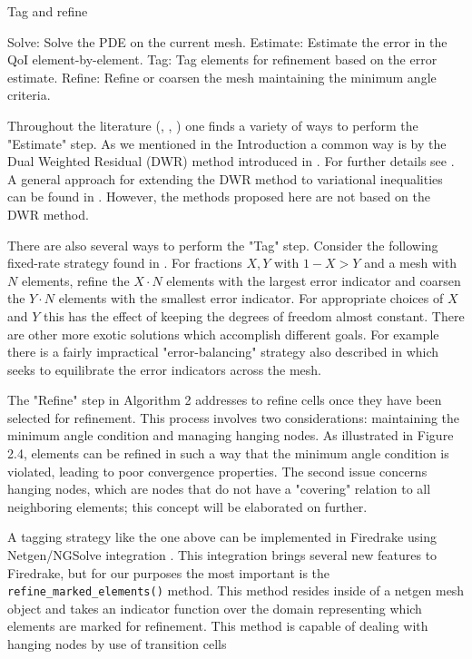 \documentclass[]{interact}
\theoremstyle{plain}%
\theoremstyle{definition}
\theoremstyle{remark}
\begin{document}
\begin{algorithm}
  \caption{Tag and refine}
  \begin{algorithmic}
    \State Solve: Solve the PDE on the current mesh. 
    \State Estimate: Estimate the error in the QoI element-by-element.
    \State Tag: Tag elements for refinement based on the error estimate.
    \State Refine: Refine or coarsen the mesh maintaining the minimum angle criteria.
  \end{algorithmic}
\end{algorithm}

Throughout the literature (\cite{BeckerRannacher2001}, \cite{BangerthRannacher2003}, \cite{Suttmeier2008}) one finds a variety of ways to perform the "Estimate" step. As we mentioned in the Introduction a common way is by the Dual Weighted Residual (DWR) method introduced in \cite{BeckerRannacher2001}. For further details see \cite[Chapter 3]{BangerthRannacher2003}. A general approach for extending the DWR method to variational inequalities can be found in \cite{Suttmeier2008}.  However, the methods proposed here are not based on the DWR method. 

There are also several ways to perform the "Tag" step. Consider the following fixed-rate strategy found in \cite[Chapter 4]{BangerthRannacher2003}. For fractions $X, Y$ with $1 - X > Y$ and a mesh with $N$ elements, refine the $X\cdot N$ elements with the largest error indicator and coarsen the $Y\cdot N$ elements with the smallest error indicator. For appropriate choices of $X$ and $Y$ this has the effect of keeping the degrees of freedom almost constant. There are other more exotic solutions which accomplish different goals. For example there is a fairly impractical "error-balancing" strategy also described in \cite[Chapter 4]{BangerthRannacher2003} which seeks to equilibrate the error indicators across the mesh.

The "Refine" step in Algorithm 2 addresses to refine cells once they have been selected for refinement. This process involves two considerations: maintaining the minimum angle condition and managing hanging nodes. As illustrated in Figure 2.4, elements can be refined in such a way that the minimum angle condition is violated, leading to poor convergence properties. The second issue concerns hanging nodes, which are nodes that do not have a "covering" relation to all neighboring elements; this concept will be elaborated on further.

A tagging strategy like the one above can be implemented in Firedrake using Netgen/NGSolve integration \cite{Betteridgeetal2024}.  This integration brings several new features to Firedrake, but for our purposes the most important is the \texttt{refine\_marked\_elements()} method.  This method resides inside of a netgen mesh object and takes an indicator function over the domain representing which elements are marked for refinement. This method is capable of dealing with hanging nodes by use of transition cells
\end{document}
